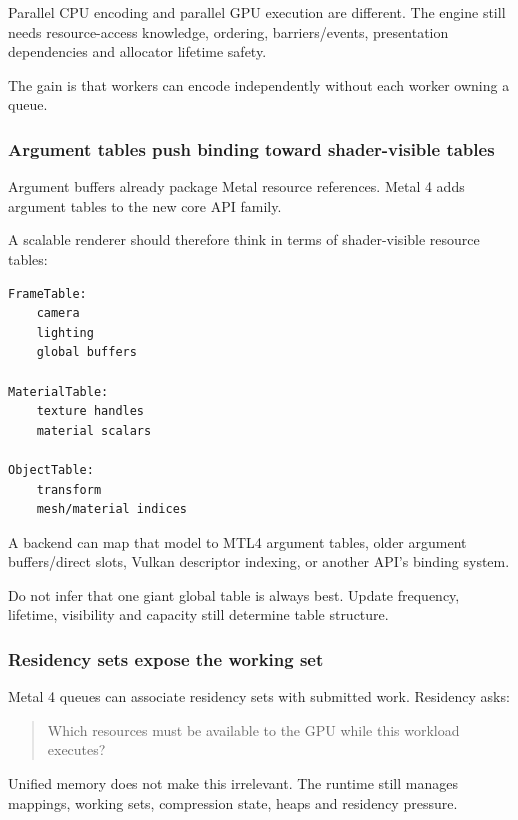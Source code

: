Parallel CPU encoding and parallel GPU execution are different. The engine still needs resource-access knowledge, ordering, barriers/events, presentation dependencies and allocator lifetime safety.

The gain is that workers can encode independently without each worker owning a queue.

\subsubsection{Argument tables push binding toward shader-visible tables}\label{05-engine-i-ch022-argument-tables-push-binding-toward-shader-visible-tables}

Argument buffers already package Metal resource references. Metal 4 adds argument tables to the new core API family.

A scalable renderer should therefore think in terms of shader-visible resource tables:

\begin{verbatim}
FrameTable:
    camera
    lighting
    global buffers

MaterialTable:
    texture handles
    material scalars

ObjectTable:
    transform
    mesh/material indices
\end{verbatim}

A backend can map that model to MTL4 argument tables, older argument buffers/direct slots, Vulkan descriptor indexing, or another API's binding system.

Do not infer that one giant global table is always best. Update frequency, lifetime, visibility and capacity still determine table structure.

\subsubsection{Residency sets expose the working set}\label{05-engine-i-ch022-residency-sets-expose-the-working-set}

Metal 4 queues can associate residency sets with submitted work. Residency asks:

\begin{quote}
Which resources must be available to the GPU while this workload executes?
\end{quote}

Unified memory does not make this irrelevant. The runtime still manages mappings, working sets, compression state, heaps and residency pressure.

